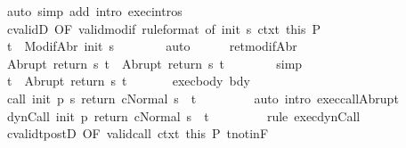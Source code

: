 \begin{isabellebody}
\ {\isacharparenleft}auto\ simp\ add{\isacharcolon}\ intro{\isacharcolon}\ exec{\isachardot}intros{\isacharparenright}\isanewline
\ \ \ \ \isamarkupfalse%
\ cvalidD\ {\isacharbrackleft}OF\ valid{\isacharunderscore}modif{\isacharprime}\ {\isacharbrackleft}rule{\isacharunderscore}format{\isacharcomma}\ of\ {\isachardoublequoteopen}init\ s{\isachardoublequoteclose}{\isacharbrackright}\ ctxt{\isacharprime}\ this{\isacharbrackright}\ P\isanewline
\ \ \ \ \isamarkupfalse%
\ {\isachardoublequoteopen}t{\isacharprime}\ {\isasymin}\ ModifAbr\ {\isacharparenleft}init\ s{\isacharparenright}{\isachardoublequoteclose}\isanewline
\ \ \ \ \ \ \isamarkupfalse%
\ auto\isanewline
\ \ \ \ \isamarkupfalse%
\ ret{\isacharunderscore}modifAbr\ \isamarkupfalse%
\ {\isachardoublequoteopen}Abrupt\ {\isacharparenleft}return\ s\ t{\isacharprime}{\isacharparenright}\ {\isacharequal}\ Abrupt\ {\isacharparenleft}return{\isacharprime}\ s\ t{\isacharprime}{\isacharparenright}{\isachardoublequoteclose}\isanewline
\ \ \ \ \ \ \isamarkupfalse%
\ simp\isanewline
\ \ \ \ \isamarkupfalse%
\ \isamarkupfalse%
\ {\isachardoublequoteopen}t\ {\isacharequal}\ Abrupt\ {\isacharparenleft}return{\isacharprime}\ s\ t{\isacharprime}{\isacharparenright}{\isachardoublequoteclose}\ \isacommand{{\isachardot}}\isamarkupfalse%
\isanewline
\ \ \ \ \isamarkupfalse%
\ exec{\isacharunderscore}body\ bdy\isanewline
\ \ \ \ \isamarkupfalse%
\ {\isachardoublequoteopen}{\isasymGamma}{\isasymturnstile}{\isasymlangle}call\ init\ {\isacharparenleft}p\ s{\isacharparenright}\ return{\isacharprime}\ c{\isacharcomma}Normal\ s{\isasymrangle}\ {\isasymRightarrow}\ t{\isachardoublequoteclose}\ \isanewline
\ \ \ \ \ \ \isamarkupfalse%
\ {\isacharparenleft}auto\ intro{\isacharcolon}\ exec{\isacharunderscore}callAbrupt{\isacharparenright}\isanewline
\ \ \ \ \isamarkupfalse%
\ {\isachardoublequoteopen}{\isasymGamma}{\isasymturnstile}{\isasymlangle}dynCall\ init\ p\ return{\isacharprime}\ c{\isacharcomma}Normal\ s{\isasymrangle}\ {\isasymRightarrow}\ t{\isachardoublequoteclose}\ \isanewline
\ \ \ \ \ \ \isamarkupfalse%
\ {\isacharparenleft}rule\ exec{\isacharunderscore}dynCall{\isacharparenright}\isanewline
\ \ \ \ \isamarkupfalse%
\ cvalidt{\isacharunderscore}postD\ {\isacharbrackleft}OF\ valid{\isacharunderscore}call\ ctxt\ this{\isacharbrackright}\ P\ t{\isacharunderscore}notin{\isacharunderscore}F\isanewline

\end{isabellebody}
